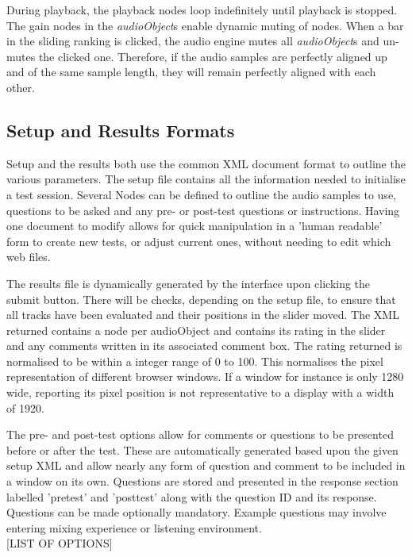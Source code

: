 \documentclass{article}
\begin{document}
During playback, the playback nodes loop indefinitely until playback is stopped. The gain nodes in the \textit{audioObject}s enable dynamic muting of nodes. When a bar in the sliding ranking is clicked, the audio engine mutes all \textit{audioObject}s and un-mutes the clicked one. Therefore, if the audio samples are perfectly aligned up and of the same sample length, they will remain perfectly aligned with each other.


\subsection{Setup and Results Formats}\label{sec:setupresultsformats}

Setup and the results both use the common XML document format to outline the various parameters. The setup file contains all the information needed to initialise a test session. Several Nodes can be defined to outline the audio samples to use, questions to be asked and any pre- or post-test questions or instructions. Having one document to modify allows for quick manipulation in a 'human readable' form to create new tests, or adjust current ones, without needing to edit which web files.

The results file is dynamically generated by the interface upon clicking the submit button. There will be checks, depending on the setup file, to ensure that all tracks have been evaluated and their positions in the slider moved. The XML returned contains a node per audioObject and contains its rating in the slider and any comments written in its associated comment box. The rating returned is normalised to be within a integer range of 0 to 100. This normalises the pixel representation of different browser windows. If a window for instance is only 1280 wide, reporting its pixel position is not representative to a display with a width of 1920.

The pre- and post-test options allow for comments or questions to be presented before or after the test. These are automatically generated based upon the given setup XML and allow nearly any form of question and comment to be included in a window on its own. Questions are stored and presented in the response section labelled 'pretest' and 'posttest' along with the question ID and its response. Questions can be made optionally mandatory. Example questions may involve entering mixing experience or listening environment.\\

[LIST OF OPTIONS]\\
\end{document}
